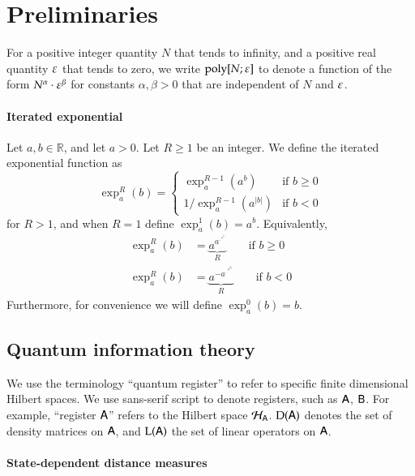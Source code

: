 

\section{Preliminaries}

For a positive integer quantity $N$ that tends to infinity, and a positive real quantity $\varepsilon$ that tends to zero, we write $\operatorname{poly}[N;\varepsilon]$ to denote a function of the form $N^\alpha \cdot \varepsilon^\beta$ for constants $\alpha, \beta > 0$ that are independent of $N$ and $\varepsilon$.

\paragraph{Iterated exponential}
Let $a,b \in \mathbb{R}$, and let $a > 0$. Let $R \geq 1$ be an integer. We define the iterated exponential function as
\[
	\exp^R_a(b) = 
	\left \{ \begin{array}{ll}
		\exp^{R-1}_a(a^b)	& \mbox{if } b \geq 0 \\
		1/\exp^{R-1}_a(a^{|b|}) & \mbox {if } b < 0
	\end{array}
	\right.
\]
for $R > 1$, and when $R=1$ define $\exp^1_a(b) = a^b$. Equivalently, 
\begin{align*}
	\exp^R_a(b) &= \underbrace{a^{a^{\cdot^{\cdot^{a^b}}}}}_{R} \qquad \mbox{if } b \geq 0 \\
	\exp^R_a(b) &= \underbrace{a^{-a^{\cdot^{\cdot^{a^{|b|}}}}}}_{R} \qquad \mbox{if } b < 0
\end{align*}
Furthermore, for convenience we will define $\exp^0_a(b) = b$.%

\subsection{Quantum information theory}

We use the terminology ``quantum register'' to refer to specific finite dimensional Hilbert spaces. We use sans-serif script to denote registers, such as ${\mathsf{A}}$, ${\mathsf{B}}$. For example, ``register ${\textsf{A}}$'' refers to the Hilbert space $\mathcal{H}_{{\textsf{A}}}$. 
$\mathrm{D}({\mathsf{A}})$ denotes the set of density matrices on ${\mathsf{A}}$, and $\mathrm{L}({\mathsf{A}})$ the set of linear operators on ${\mathsf{A}}$.

\paragraph{State-dependent distance measures}

